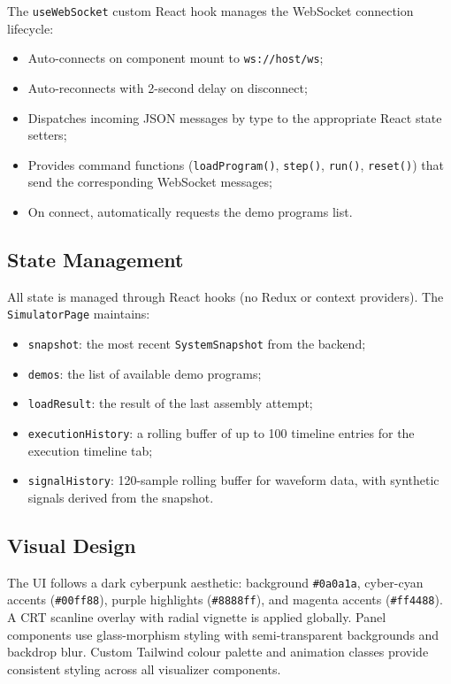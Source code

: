 \documentclass[10pt,a4paper,twoside]{book}
\begin{document}
The \texttt{useWebSocket} custom React hook manages the WebSocket
connection lifecycle:
\begin{itemize}
    \item Auto-connects on component mount to \texttt{ws://host/ws};
    \item Auto-reconnects with 2-second delay on disconnect;
    \item Dispatches incoming JSON messages by type to the appropriate
          React state setters;
    \item Provides command functions (\texttt{loadProgram()},
          \texttt{step()}, \texttt{run()}, \texttt{reset()}) that
          send the corresponding WebSocket messages;
    \item On connect, automatically requests the demo programs list.
\end{itemize}

\subsection{State Management}

All state is managed through React hooks (no Redux or context providers).
The \texttt{SimulatorPage} maintains:
\begin{itemize}
    \item \texttt{snapshot}: the most recent \texttt{SystemSnapshot} from
          the backend;
    \item \texttt{demos}: the list of available demo programs;
    \item \texttt{loadResult}: the result of the last assembly attempt;
    \item \texttt{executionHistory}: a rolling buffer of up to 100
          timeline entries for the execution timeline tab;
    \item \texttt{signalHistory}: 120-sample rolling buffer for waveform
          data, with synthetic signals derived from the snapshot.
\end{itemize}

\subsection{Visual Design}

The UI follows a dark cyberpunk aesthetic: background \texttt{\#0a0a1a},
cyber-cyan accents (\texttt{\#00ff88}), purple highlights
(\texttt{\#8888ff}), and magenta accents (\texttt{\#ff4488}). A CRT
scanline overlay with radial vignette is applied globally. Panel
components use glass-morphism styling with semi-transparent backgrounds
and backdrop blur. Custom Tailwind colour palette and animation classes
provide consistent styling across all visualizer components.
\end{document}

